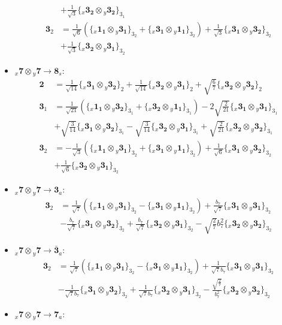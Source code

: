 \documentclass[english]{article}
\newcommand{\rep}[1]{\mathbf{#1}}
\newcommand{\repx}[2]{{}_{#2}\mathbf{#1}}
\newcommand{\tsprodx}[2]{\repx{#1}{x}\otimes\repx{#2}{y}}
\newcommand{\subcgs}[3]{\big\{ \tsprodx{#1}{#2}\big\}^{}_{#3}}
\begin{document}
\begin{itemize}
\begin{align*}
 & +\frac{1}{\sqrt{3}}\subcgs{3_{2}}{3_{2}}{3_{1}}
\\
\rep{3}_{2} & = \frac{1}{\sqrt{6}}\left(\subcgs{1_{1}}{3_{1}}{3_{2}}+\subcgs{3_{1}}{1_{1}}{3_{2}}\right)+\frac{1}{\sqrt{3}}\subcgs{3_{1}}{3_{2}}{3_{2}} \\ 
 & +\frac{1}{\sqrt{3}}\subcgs{3_{2}}{3_{1}}{3_{2}}
\end{align*}
\item $\tsprodx{7}{7}\to\rep{8}_{s}$:
\begin{align*}
\rep{2} & = \frac{1}{\sqrt{14}}\subcgs{3_{1}}{3_{2}}{2}+\frac{1}{\sqrt{14}}\subcgs{3_{2}}{3_{1}}{2}+\sqrt{\frac{6}{7}}\subcgs{3_{2}}{3_{2}}{2}
\\
\rep{3}_{1} & = \frac{1}{\sqrt{21}}\left(\subcgs{1_{1}}{3_{2}}{3_{1}}+\subcgs{3_{2}}{1_{1}}{3_{1}}\right)-2 \sqrt{\frac{2}{21}}\subcgs{3_{1}}{3_{1}}{3_{1}} \\ 
 & +\sqrt{\frac{3}{14}}\subcgs{3_{1}}{3_{2}}{3_{1}}-\sqrt{\frac{3}{14}}\subcgs{3_{2}}{3_{1}}{3_{1}}+\sqrt{\frac{2}{21}}\subcgs{3_{2}}{3_{2}}{3_{1}}
\\
\rep{3}_{2} & = -\frac{1}{\sqrt{3}}\left(\subcgs{1_{1}}{3_{1}}{3_{2}}+\subcgs{3_{1}}{1_{1}}{3_{2}}\right)+\frac{1}{\sqrt{6}}\subcgs{3_{1}}{3_{2}}{3_{2}} \\ 
 & +\frac{1}{\sqrt{6}}\subcgs{3_{2}}{3_{1}}{3_{2}}
\end{align*}
\item $\tsprodx{7}{7}\to\rep{3}_{a}$:
\begin{align*}
\rep{3}_{2} & = \frac{1}{\sqrt{7}}\left(\subcgs{1_{1}}{3_{1}}{3_{2}}-\subcgs{3_{1}}{1_{1}}{3_{2}}\right)+\frac{b_7}{\sqrt{7}}\subcgs{3_{1}}{3_{1}}{3_{2}} \\ 
 & -\frac{b_7}{\sqrt{7}}\subcgs{3_{1}}{3_{2}}{3_{2}}+\frac{b_7}{\sqrt{7}}\subcgs{3_{2}}{3_{1}}{3_{2}}-\sqrt{\frac{2}{7}} b_7^2\subcgs{3_{2}}{3_{2}}{3_{2}}
\end{align*}
\item $\tsprodx{7}{7}\to\rep{\bar{3}}_{a}$:
\begin{align*}
\rep{3}_{2} & = \frac{1}{\sqrt{7}}\left(\subcgs{1_{1}}{3_{1}}{3_{2}}-\subcgs{3_{1}}{1_{1}}{3_{2}}\right)+\frac{1}{\sqrt{7} b_7}\subcgs{3_{1}}{3_{1}}{3_{2}} \\ 
 & -\frac{1}{\sqrt{7} b_7}\subcgs{3_{1}}{3_{2}}{3_{2}}+\frac{1}{\sqrt{7} b_7}\subcgs{3_{2}}{3_{1}}{3_{2}}-\frac{\sqrt{\frac{2}{7}}}{b_7^2}\subcgs{3_{2}}{3_{2}}{3_{2}}
\end{align*}
\item $\tsprodx{7}{7}\to\rep{7}_{a}$:
\begin{align*}

\end{align*}
\end{itemize}
\end{document}
